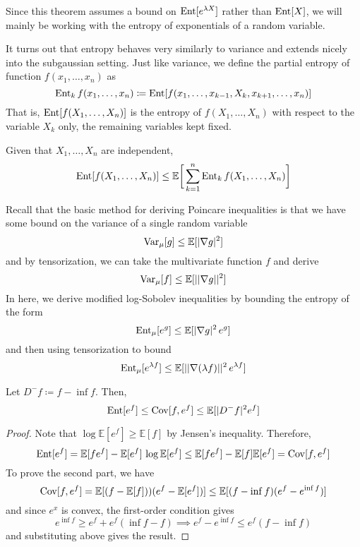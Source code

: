   Since this theorem assumes a bound on $\Ent[e^{\lambda X}]$ rather than $\Ent[X]$, we will mainly be working with the entropy of exponentials of a random variable. 

  It turns out that entropy behaves very similarly to variance and extends nicely into the subgaussian setting. Just like variance, we define the partial entropy of function $f(x_1, \ldots, x_n)$ as 
  \[\Ent_k f (x_1, \ldots, x_n) \coloneqq \Ent[ f(x_1, \ldots, x_{k-1}, X_k , x_{k+1}, \ldots, x_n)]\]
  That is, $\Ent[f(X_1, \ldots, X_n)]$ is the entropy of $f(X_1, \ldots, X_n)$ with respect to the variable $X_k$ only, the remaining variables kept fixed. 

  \begin{theorem}
  Given that $X_1, \ldots, X_n$ are independent, 
  \[\Ent[ f(X_1, \ldots, X_n)] \leq \mathbb{E} \bigg[ \sum_{k=1}^n \Ent_k f (X_1, \ldots, X_n) \bigg]\]
  \end{theorem}

  Recall that the basic method for deriving Poincare inequalities is that we have some bound on the variance of a single random variable 
  \[\Var_\mu [g] \leq \mathbb{E}[|\nabla g|^2]\]
  and by tensorization, we can take the multivariate function $f$ and derive 
  \[\Var_\mu [f] \leq \mathbb{E}[ ||\nabla g||^2 ]\]
  In here, we derive modified log-Sobolev inequalities by bounding the entropy of the form 
  \[\Ent_\mu [e^g] \leq \mathbb{E}[ |\nabla g|^2 \, e^g ]\]
  and then using tensorization to bound 
  \[\Ent_\mu [e^{\lambda f}] \leq \mathbb{E} [ ||\nabla (\lambda f)||^2 \, e^{\lambda f} ]\]

  \begin{lemma}
  Let $D^- f \coloneqq f - \inf f$. Then, 
  \[\Ent[e^f] \leq \Cov[f, e^f] \leq \mathbb{E}[|D^- f|^2 e^f]\]
  \end{lemma}
  \begin{proof}
  Note that $\log \mathbb{E}[e^f] \geq \mathbb{E}[f]$ by Jensen's inequality. Therefore, 
  \[\Ent[e^f] = \mathbb{E}[f e^f] - \mathbb{E}[e^f] \, \log \mathbb{E}[e^f] \leq \mathbb{E}[f e^f] - \mathbb{E}[f] \mathbb{E}[e^f] = \Cov[f, e^f]\]
  To prove the second part, we have 
  \[\Cov[f, e^f] = \mathbb{E}[(f - \mathbb{E}[f]))(e^f - \mathbb{E}[e^f])] \leq \mathbb{E}[(f - \inf f)(e^f - e^{\inf f})] \]
  and since $e^x$ is convex, the first-order condition gives 
  \[e^{\inf f} \geq e^f + e^f (\inf f - f) \implies e^f - e^{\inf f} \leq e^f (f - \inf f)\]
  and substituting above gives the result. 
  \end{proof}

